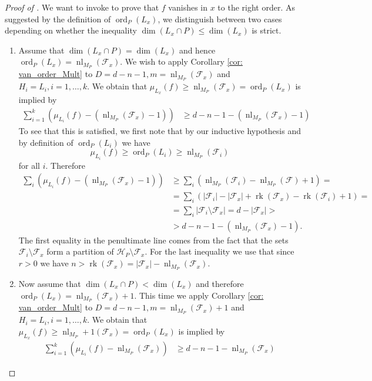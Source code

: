 \documentclass[10pt,a4paper]{amsart}
\newcommand{\cF}{{\mathcal F}}
\newcommand{\cH}{{\mathcal H}}
\newcommand{\nl}{\operatorname{nl}}
\newcommand{\ord}{\operatorname{ord}}
\newcommand{\rk}{\operatorname{rk}}
\begin{document}
\begin{proof}[Proof of ]
We want to invoke  to prove that $f$ vanishes in $x$ to the right order. As suggested by the definition of $\ord_P(L_x)$, we distinguish between two cases depending on whether the inequality $\dim(L_x\cap P)\leq \dim (L_x)$ is strict.
\begin{enumerate}
    \item Assume that $\dim(L_x\cap P)= \dim (L_x)$ and hence $\ord_P(L_x)=\nl_{M_P}(\cF_x)$. We wish to apply Corollary \ref{cor: van_order_Mult} to $D=d-n-1,m=\nl_{M_P}(\cF_x)$ and $H_i=L_i, i=1,\ldots,k$. We obtain that $\mu_{L_x}(f)\geq \nl_{M_P}(\cF_x)=\ord_P(L_x)$ is implied by 
    \begin{equation*}
    \begin{split}
        \sum_{i=1}^k \left(\mu_{L_i}(f) - (\nl_{M_P}(\cF_x) - 1)\right) &\geq d-n-1 - (\nl_{M_P}(\cF_x) - 1)
    \end{split}
    \end{equation*}
    To see that this is satisfied, we first note that by our inductive hypothesis and by definition of $\ord_P(L_i)$ we have
    \begin{equation*}
        \mu_{L_i}(f) \geq \ord_P(L_i) \geq \nl_{M_P}(\cF_i) 
    \end{equation*}
    for all $i$. Therefore
    \begin{equation*}
    \begin{split}
        \sum_i \left( \mu_{L_i}(f) - (\nl_{M_P}(\cF_x) - 1) \right) &\geq \sum_i \left( \nl_{M_P}(\cF_i) - \nl_{M_P}(\cF) + 1 \right) = \\
        &= \sum_i \left(|\cF_i| - |\cF_x| + \rk(\cF_x) - \rk(\cF_i) + 1\right) = \\
        &= \sum_i |\cF_i \setminus \cF_x| = d  - |\cF_x| > \\
        &> d - n - 1 - (\nl_{M_P}(\cF_x) - 1).
    \end{split}
    \end{equation*}
    The first equality in the penultimate line comes from the fact that the sets $\cF_i\setminus \cF_x$ form a partition of $\cH_P\setminus \cF_x$. For the last inequality we use that since $r > 0$ we have $n > \rk(\cF_x) = |\cF_x| - \nl_{M_P}(\cF_x)$.
    
    \item Now assume that $\dim(L_x\cap P)< \dim (L_x)$ and therefore $\ord_P(L_x)=\nl_{M_P}(\cF_x)+1$. This time we apply Corollary \ref{cor: van_order_Mult} to $D=d-n-1,m=\nl_{M_P}(\cF_x)+1$ and $H_i=L_i, i=1,\ldots,k$. We obtain that $\mu_{L_x}(f)\geq \nl_{M_P}+1(\cF_x)=\ord_P(L_x)$ is implied by 
    \begin{equation*}
    \begin{split}
        \sum_{i=1}^k \left(\mu_{L_i}(f) - \nl_{M_P}(\cF_x)\right) &\geq d-n-1 - \nl_{M_P}(\cF_x)
    \end{split}
    \end{equation*}


\end{enumerate}
\end{proof}
\end{document}
